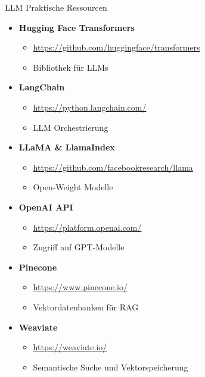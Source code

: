 \documentclass[aspectratio=1610, xcolor=dvipsnames, 9pt]{beamer}
\begin{document}
\begin{frame}{LLM Praktische Ressourcen}
\begin{itemize}
\item \textbf{Hugging Face Transformers}
\begin{itemize}
\item \url{https://github.com/huggingface/transformers}
\item Bibliothek für LLMs
\end{itemize}

\item \textbf{LangChain}
\begin{itemize}
\item \url{https://python.langchain.com/}
\item LLM Orchestrierung
\end{itemize}

\item \textbf{LLaMA \& LlamaIndex}
\begin{itemize}
\item \url{https://github.com/facebookresearch/llama}
\item Open-Weight Modelle
\end{itemize}

\item \textbf{OpenAI API}
\begin{itemize}
\item \url{https://platform.openai.com/}
\item Zugriff auf GPT-Modelle
\end{itemize}

\item \textbf{Pinecone}
\begin{itemize}
\item \url{https://www.pinecone.io/}
\item Vektordatenbanken für RAG
\end{itemize}

\item \textbf{Weaviate}
\begin{itemize}
\item \url{https://weaviate.io/}
\item Semantische Suche und Vektorspeicherung
\end{itemize}
\end{itemize}
\end{frame}
\end{document}
